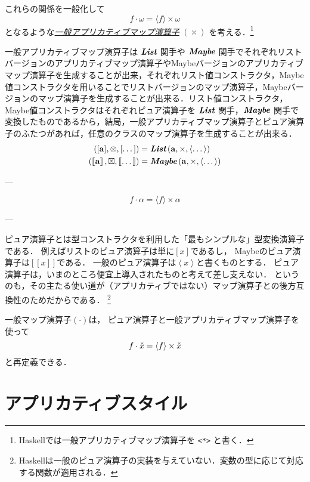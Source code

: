 \documentclass[a4paper,draft]{jsbook}
\def\[{\left[\!\left[}
\def\]{\right]\!\right]}
\newcommand{\programminglanguage}[1]{\textsf{#1}}
\newcommand{\haskell}{\programminglanguage{Haskell}}
\newcommand{\keyword}[1]{{\underline{\emph{#1}}}}
\newcommand{\code}[1]{\texttt{#1}}
\newcommand{\mType}[1]{\mathbf{#1}}
\newcommand{\mListType}[1]{[\mType{#1}]}
\newcommand{\mMaybeType}[1]{\[\mType{#1}\]}
\newcommand{\mFunctor}[1]{\textit{\textbf{#1}}}
\newcommand{\mListWith}[1]{\left[#1\right]}
\newcommand{\mTupleWith}[1]{\left(#1\right)}
\newcommand{\mMaybeWith}[1]{\[#1\]}
\newcommand{\mPureWith}[1]{\langle#1\rangle}
\DeclareMathOperator{\mMap}{\cdot}
\DeclareMathOperator{\mApplicativeMap}{\times}
\DeclareMathOperator{\mApplicativeMapList}{\otimes}
\DeclareMathOperator{\mApplicativeMapMaybe}{\boxtimes}
\DeclareMathOperator{\mListFunctor}{\mFunctor{List}}
\DeclareMathOperator{\mMaybeFunctor}{\mFunctor{Maybe}}
\newcommand{\mathContainerVar}[1]{\Check{#1}}
\newcommand{\mathMaybeWith}[1]{\[#1\]}
\newcommand{\mathPureWith}[1]{\left\langle#1\right\rangle}
\newcommand{\mathApplicativeGeneralMap}{\mathbin{\times}}
\newcommand{\mathGeneralMap}{\mathbin{\cdot}}
\begin{document}
これらの関係を一般化して
\begin{equation}
f\mMap\omega=\mPureWith{f}\mApplicativeMap\omega
\end{equation}
となるような\keyword{一般アプリカティブマップ演算子} $(\mApplicativeMap)$ を考える．\footnote{\haskell では一般アプリカティブマップ演算子を \code{<*>} と書く．}

一般アプリカティブマップ演算子は $\mListFunctor$ 関手や $\mMaybeFunctor$ 関手でそれぞれリストバージョンのアプリカティブマップ演算子やMaybeバージョンのアプリカティブマップ演算子を生成することが出来，それぞれリスト値コンストラクタ，Maybe値コンストラクタを用いることでリストバージョンのマップ演算子，Maybeバージョンのマップ演算子を生成することが出来る．リスト値コンストラクタ，Maybe値コンストラクタはそれぞれピュア演算子を $\mListFunctor$ 関手，$\mMaybeFunctor$ 関手で変換したものであるから，結局，一般アプリカティブマップ演算子とピュア演算子のふたつがあれば，任意のクラスのマップ演算子を生成することが出来る．
\begin{align}
\mTupleWith{\mListType{a},\mApplicativeMapList,\mListWith{\dots}}
&=\mListFunctor\mTupleWith{\mType{a},\mApplicativeMap,\mPureWith{\dots}}\\
\mTupleWith{\mMaybeType{a},\mApplicativeMapMaybe,\mMaybeWith{\dots}}
&=\mMaybeFunctor\mTupleWith{\mType{a},\mApplicativeMap,\mPureWith{\dots}}
\end{align}


---

$$f\mMap\alpha=\mPureWith{f}\mApplicativeMap\alpha$$


---

ピュア演算子とは型コンストラクタを利用した「最もシンプルな」型変換演算子である．
例えばリストのピュア演算子は単に$[x]$であるし，
Maybeのピュア演算子は$\mathMaybeWith{x}$である．
一般のピュア演算子は$\mathPureWith{x}$と書くものとする．
ピュア演算子は，いまのところ便宜上導入されたものと考えて差し支えない．
というのも，その主たる使い道が（アプリカティブではない）マップ演算子との後方互換性のためだからである．%
\footnote{\haskell は一般のピュア演算子の実装を与えていない．変数の型に応じて対応する関数が適用される．}

一般マップ演算子$(\mathGeneralMap)$は，
ピュア演算子と一般アプリカティブマップ演算子を使って
$$
f\mathGeneralMap\mathContainerVar{x}=\mathPureWith{f}\mathApplicativeGeneralMap\mathContainerVar{x}
$$
と再定義できる．


\section{アプリカティブスタイル}
\end{document}
